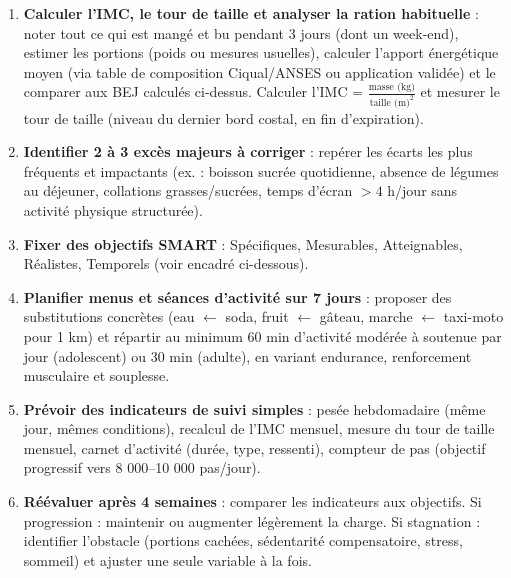 \documentclass[11pt]{article}
\begin{document}
\begin{methode}
\begin{enumerate}
    \item \textbf{Calculer l'IMC, le tour de taille et analyser la ration habituelle} : noter tout ce qui est mangé et bu pendant 3 jours (dont un week-end), estimer les portions (poids ou mesures usuelles), calculer l'apport énergétique moyen (via table de composition Ciqual/ANSES ou application validée) et le comparer aux BEJ calculés ci-dessus. Calculer l'IMC = $\frac{\text{masse (kg)}}{\text{taille (m)}^2}$ et mesurer le tour de taille (niveau du dernier bord costal, en fin d'expiration).
    \item \textbf{Identifier 2 à 3 excès majeurs à corriger} : repérer les écarts les plus fréquents et impactants (ex. : boisson sucrée quotidienne, absence de légumes au déjeuner, collations grasses/sucrées, temps d'écran $> 4$ h/jour sans activité physique structurée).
    \item \textbf{Fixer des objectifs SMART} : Spécifiques, Mesurables, Atteignables, Réalistes, Temporels (voir encadré ci-dessous).
    \item \textbf{Planifier menus et séances d'activité sur 7 jours} : proposer des substitutions concrètes (eau $\leftarrow$ soda, fruit $\leftarrow$ gâteau, marche $\leftarrow$ taxi-moto pour 1 km) et répartir au minimum 60 min d'activité modérée à soutenue par jour (adolescent) ou 30 min (adulte), en variant endurance, renforcement musculaire et souplesse.
    \item \textbf{Prévoir des indicateurs de suivi simples} : pesée hebdomadaire (même jour, mêmes conditions), recalcul de l'IMC mensuel, mesure du tour de taille mensuel, carnet d'activité (durée, type, ressenti), compteur de pas (objectif progressif vers 8 000--10 000 pas/jour).
    \item \textbf{Réévaluer après 4 semaines} : comparer les indicateurs aux objectifs. Si progression : maintenir ou augmenter légèrement la charge. Si stagnation : identifier l'obstacle (portions cachées, sédentarité compensatoire, stress, sommeil) et ajuster une seule variable à la fois.
\end{enumerate}
\end{methode}
\end{document}
